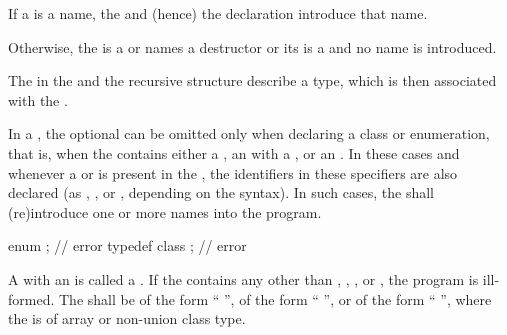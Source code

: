 \pnum
If a  is a name, the
 and (hence) the declaration introduce that name.
\begin{note}
Otherwise, the  is
a  or
names a destructor or
its  is a  and
no name is introduced.
\end{note}
The  in
the  and
the recursive  structure
describe a type,
which is then associated with the .

\pnum
{}%
%
In a , the optional
 can be omitted only when declaring a
class or enumeration, that is,
when the  contains either a
, an  with
a , or an
. In these cases and whenever a
 or  is present in
the , the identifiers in these specifiers
are also declared (as
, , or
, depending on the syntax). In such cases,
the  shall (re)introduce one or more names into
the program.
\begin{example}
\begin{codeblock}
enum { };           // error
typedef class { };  // error
\end{codeblock}
\end{example}

\pnum
A  with an  is called
a .
If the  contains
any  other than
, , , or
,
the program is ill-formed.
The  shall be
of the form ``\tcode{=} '',
of the form ``\tcode{\{}  \tcode{\}}'',
or
of the form ``\tcode{(}  \tcode{)}'',
where the
 is of array or non-union class type.

